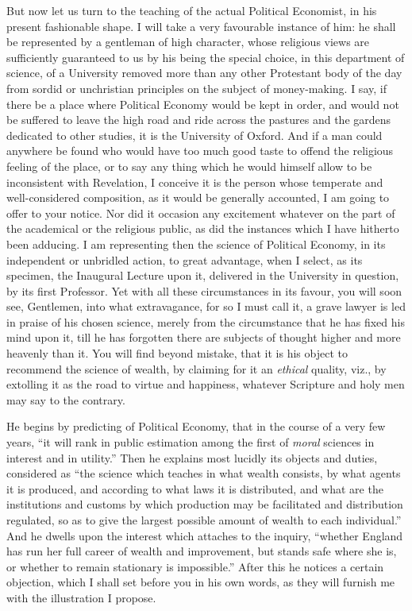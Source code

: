 But now let us turn to the teaching of the actual Political
Economist, in his present fashionable shape. I will take a very
favourable instance of him: he shall be represented by a gentleman of
high character, whose religious views are sufficiently guaranteed to
us by his being the special choice, in this department of science, of
a University removed more than any other Protestant body of the day
from sordid or unchristian principles on the subject of money-making.
I say, if there be a place where Political Economy would be kept in
order, and would not be suffered to leave the high road and ride
across the pastures and the gardens dedicated to other studies, it is
the University of Oxford. And if a man could anywhere be found who
would have too much good taste to offend the religious feeling of the
place, or to say any thing which he would himself allow to be
inconsistent with Revelation, I conceive it is the person whose
temperate and well-considered composition, as it would be generally
accounted, I am going to offer to your notice. Nor did it occasion any
excitement whatever on the part of the academical or the religious
public, as did the instances which I have hitherto been adducing. I am
representing then the science of Political Economy, in its independent
or unbridled action, to great advantage, when I select, as its
specimen, the Inaugural Lecture upon it, delivered in the University
in question, by its first Professor. Yet with all these circumstances
in its favour, you will soon see, Gentlemen, into what extravagance,
for so I must call it, a grave lawyer is led in praise of his chosen
science, merely from the circumstance that he has fixed his mind upon
it, till he has forgotten there are subjects of thought higher and
more heavenly than it. You will find beyond mistake, that it is his
object to recommend the science of wealth, by claiming for it an \emph{ethical}
quality, viz., by extolling it as the road to virtue and happiness,
whatever Scripture and holy men may say to the contrary.

He begins by predicting of Political Economy, that in the course of
a very few years, ``it will rank in public estimation among the
first of \emph{moral} sciences in interest and in utility.'' Then
he explains most lucidly its objects and duties, considered as
``the science which teaches in what wealth consists, by what
agents it is produced, and according to what laws it is distributed,
and what are the institutions and customs by which production may
be facilitated and distribution regulated, so as to give the largest
possible amount of wealth to each individual.'' And he dwells upon
the interest which attaches to the inquiry, ``whether England has
run her full career of wealth and improvement, but stands safe where
she is, or whether to remain stationary is impossible.'' After
this he notices a certain objection, which I shall set before you in
his own words, as they will furnish me with the illustration I
propose.

